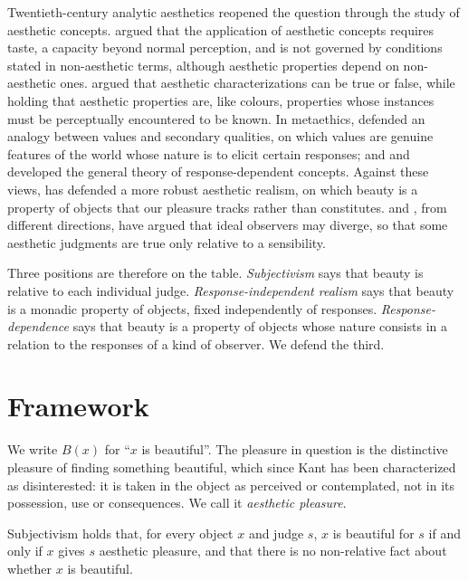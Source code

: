 \documentclass{situationist-preprint}
\begin{document}
Twentieth-century analytic aesthetics reopened the question through the study of aesthetic concepts. \citet{Sibley1959} argued that the application of aesthetic concepts requires taste, a capacity beyond normal perception, and is not governed by conditions stated in non-aesthetic terms, although aesthetic properties depend on non-aesthetic ones. \citet{Pettit1983} argued that aesthetic characterizations can be true or false, while holding that aesthetic properties are, like colours, properties whose instances must be perceptually encountered to be known. In metaethics, \citet{McDowell1985} defended an analogy between values and secondary qualities, on which values are genuine features of the world whose nature is to elicit certain responses; and \citet{Johnston1989} and \citet{Wright1992} developed the general theory of response-dependent concepts. Against these views, \citet{Zangwill2001} has defended a more robust aesthetic realism, on which beauty is a property of objects that our pleasure tracks rather than constitutes. \citet{Goldman1995} and \citet{Levinson2001}, from different directions, have argued that ideal observers may diverge, so that some aesthetic judgments are true only relative to a sensibility.

Three positions are therefore on the table. \emph{Subjectivism} says that beauty is relative to each individual judge. \emph{Response-independent realism} says that beauty is a monadic property of objects, fixed independently of responses. \emph{Response-dependence} says that beauty is a property of objects whose nature consists in a relation to the responses of a kind of observer. We defend the third.

\section{Framework}

We write $B(x)$ for \enquote{$x$ is beautiful}. The pleasure in question is the distinctive pleasure of finding something beautiful, which since Kant has been characterized as disinterested: it is taken in the object as perceived or contemplated, not in its possession, use or consequences. We call it \emph{aesthetic pleasure}.

\begin{definition}[Subjectivism]\label{d:subj}
Subjectivism holds that, for every object $x$ and judge $s$, $x$ is beautiful for $s$ if and only if $x$ gives $s$ aesthetic pleasure, and that there is no non-relative fact about whether $x$ is beautiful.
\end{definition}
\end{document}
